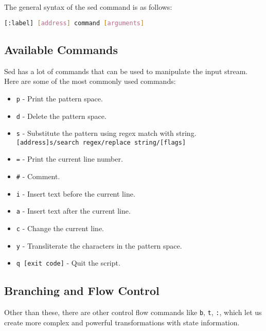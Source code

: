 The general syntax of the sed command is as follows:

\begin{lstlisting}[language=bash]
[:label] [address] command [arguments]
\end{lstlisting}

\subsection{Available Commands}

Sed has a lot of commands that can be used to manipulate the input stream. Here are some of the most commonly used commands:

\begin{itemize}
  \item \lstinline|p| - Print the pattern space.
  \item \lstinline|d| - Delete the pattern space.
  \item \lstinline|s| - Substitute the pattern using regex match with string. \\
    \lstinline|[address]s/search regex/replace string/[flags]|
  \item \lstinline|=| - Print the current line number.
  \item \lstinline|#| - Comment.
  \item \lstinline|i| - Insert text before the current line.
  \item \lstinline|a| - Insert text after the current line.
  \item \lstinline|c| - Change the current line.
  \item \lstinline|y| - Transliterate the characters in the pattern space.
  \item \lstinline|q [exit code]| - Quit the script.
\end{itemize}

\subsection{Branching and Flow Control}
Other than these, there are other control flow commands like \lstinline|b|, \lstinline|t|, \lstinline|:|, which let us create more complex and powerful transformations with state information.


